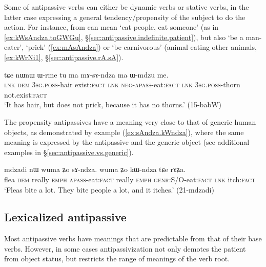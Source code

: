 Some of  antipassive verbs can either be dynamic verbs or stative verbs, in the latter case expressing a general tendency/propensity of the subject to do the action. For instance,  from  can mean `eat people, eat someone' (as in \ref{ex:kWsAndza.toGWGu}, §\ref{sec:antipassive.indefinite.patient}), but also `be a man-eater', `prick' (\ref{ex:mAsAndza}) or `be carnivorous' (animal eating other animals, \ref{ex:kWrNi1}, §\ref{sec:antipassive.rA.sA}).

\begin{exe}
\ex \label{ex:mAsAndza}
\gll tɕe nɯnɯ ɯ-rme tu ma mɤ-sɤ-ndza ma ɯ-mdzu me.  \\
\textsc{lnk} \textsc{dem} \textsc{3sg}.\textsc{poss}-hair exist:\textsc{fact} \textsc{lnk} \textsc{neg}-\textsc{apass}-eat:\textsc{fact} \textsc{lnk} \textsc{3sg}.\textsc{poss}-thorn not.exist:\textsc{fact} \\
\glt `It has hair, but does not prick, because it has no thorns.' (15-babW)
\end{exe}

The propensity antipassives have a meaning very close to that of generic human objects, as demonstrated by example (\ref{ex:sAndza.kWndza}), where the same meaning is expressed by the antipassive  and the generic object   (see additional examples in §\ref{sec:antipassive.vs.generic}).
 
\begin{exe}
\ex \label{ex:sAndza.kWndza}
\gll  mdzadi nɯ wuma ʑo sɤ-ndza. wuma ʑo kɯ-ndza tɕe rɤʑa. \\
flea \textsc{dem} really \textsc{emph} \textsc{apass}-eat:\textsc{fact} really \textsc{emph} \textsc{genr}:S/O-eat:\textsc{fact} \textsc{lnk} itch:\textsc{fact} \\
\glt `Fleas bite a lot. They bite people a lot, and it itches.' (21-mdzadi)
\end{exe}

\subsection{Lexicalized antipassive} \label{sec:antipassive.lexicalized} 
 
Most antipassive verbs have meanings that are predictable from that of their base verbs. However, in some cases antipassivization not only demotes the patient from object status, but restricts the range of meanings of the verb root.

